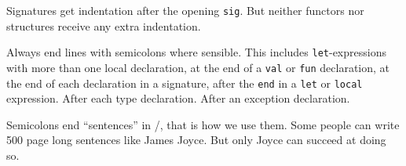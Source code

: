 \begin{node}
Signatures get indentation after the opening \texttt{sig}.
But neither functors nor structures receive any extra indentation.
\end{node}

\begin{node}
Always end lines with semicolons where sensible. This includes
\texttt{let}-expressions with more than one local declaration, at the
end of a \texttt{val} or \texttt{fun} declaration, at the end of each
declaration in a signature, after the \texttt{end} in a \texttt{let}
or \texttt{local} expression. After each type declaration. After an
exception declaration.

Semicolons end ``sentences'' in \SML/, that is how we use them. Some
people can write 500 page long sentences like James Joyce. But only
Joyce can succeed at doing so.
\end{node}